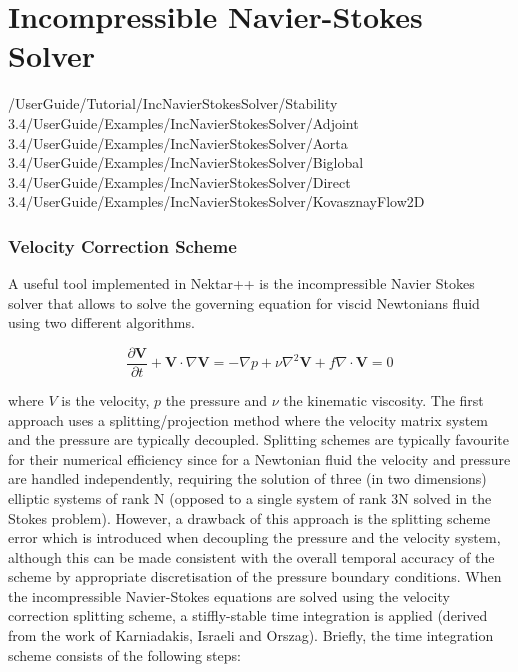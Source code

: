\section{Incompressible Navier-Stokes Solver}
\label{IncNSsolver}

/UserGuide/Tutorial/IncNavierStokesSolver/Stability
3.4/UserGuide/Examples/IncNavierStokesSolver/Adjoint
3.4/UserGuide/Examples/IncNavierStokesSolver/Aorta
3.4/UserGuide/Examples/IncNavierStokesSolver/Biglobal
3.4/UserGuide/Examples/IncNavierStokesSolver/Direct
3.4/UserGuide/Examples/IncNavierStokesSolver/KovasznayFlow2D
\subsubsection{Velocity Correction Scheme}
\label{VCSscheme}
A useful tool implemented in Nektar++ is the incompressible Navier Stokes solver that allows to solve the governing equation for viscid Newtonians fluid using two different algorithms. 

\begin{subequations}
\begin{equation}
   \frac{\partial \mathbf{V}}{\partial t} + \mathbf{V} \cdot \nabla \mathbf{V} = -\nabla p + \nu \nabla^2 \mathbf{V} + f
 \end{equation}
 
 \begin{equation}
    \nabla \cdot \mathbf{V} = 0
    \end{equation}
 \end{subequations}
 
where $V$ is the velocity, $p$ the pressure and $\nu$ the kinematic viscosity. The first approach uses a splitting/projection method where the velocity matrix system and the pressure are typically decoupled. Splitting schemes are typically favourite for their numerical efficiency since for a Newtonian fluid the velocity and pressure are handled independently, requiring the solution of three (in two dimensions) elliptic systems of rank N (opposed to a single system of rank 3N solved in the Stokes problem). However, a drawback of this approach is the splitting scheme error which is introduced when decoupling the pressure and the velocity system, although this can be made consistent with the overall temporal accuracy of the scheme by appropriate discretisation of the pressure boundary conditions. When the incompressible Navier-Stokes equations are solved using the velocity correction splitting scheme, a stiffly-stable time integration is applied (derived from the work of Karniadakis, Israeli and Orszag).
 Briefly, the time integration scheme consists of the following steps:\\
 

